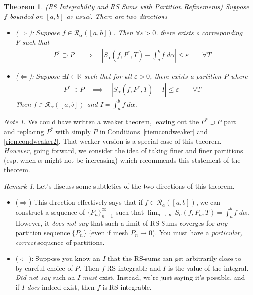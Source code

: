 \documentclass[12pt]{book}
\numberwithin{equation}{section} %
\theoremstyle{plain}
\newtheorem{thm}{Theorem}[section]
\theoremstyle{definition}
\theoremstyle{remark}
\newtheorem*{rmk}{Remark}
\newtheorem*{note}{Note}
\newcommand{\limn}{\lim_{n\rightarrow\infty}}
\newcommand{\ra}{\rightarrow}
\newcommand{\sR}{\mathscr{R}}
\newcommand{\R}{\mathbb{R}}
\begin{document}
\begin{thm}
\emph{(RS Integrability and RS Sums with Partition Refinements)}
\label{weaker}
Suppose $f$ bounded on $[a,b]$ as usual.
There are two directions
\begin{itemize}
  \item \emph{($\Rightarrow$)}:
    Suppose $f\in\sR_\alpha([a,b])$.
    Then $\forall\varepsilon>0$, there exists a corresponding $P$ such
    that
    \begin{align}
      P^*\supset P\quad\implies\quad
      \left\lvert S_\alpha(f,P^*,T) - \int^b_af\;d\alpha \right\rvert
      \leq \varepsilon \qquad \forall T
      \label{riemcondweaker}
    \end{align}
  \item \emph{($\Leftarrow$)}:
    Suppose $\exists I\in\R$ such that for all $\varepsilon>0$, there
    exists a partition $P$ where
    \begin{align}
      P^*\supset P\quad\implies\quad
      \left\lvert S_\alpha(f,P^*,T) - I \right\rvert
      \leq \varepsilon \qquad \forall T
      \label{riemcondweaker2}
    \end{align}
    Then $f\in\mathscr{R}_\alpha([a,b])$ and
     $I = \int^b_a f\;d\alpha$.
\end{itemize}
\end{thm}
\begin{note}
We could have written a weaker theorem, leaving out the $P^*\supset P$
part and replacing $P^*$ with simply $P$ in
Conditions~\ref{riemcondweaker} and \ref{riemcondweaker2}.
That weaker version is a special case of this theorem.
\emph{However}, going forward, we consider the idea of taking
finer and finer partitions (esp. when $\alpha$ might not be increasing)
which recommends this statement of the theorem.
\end{note}
\begin{rmk}
Let's discuss some subtleties of the two directions of this theorem.
\begin{itemize}
  \item ($\Rightarrow$)
    This direction effectively says that if $f\in\sR_\alpha([a,b])$,
    we can construct a sequence of $\{P_n\}_{n=1}^\infty$ such that
    $\limn S_\alpha(f,P_n,T)=\int^b_af\;d\alpha$.
    However, it \emph{does not say} that such a limit of RS Sums
    coverges for \emph{any} partition sequence $\{P_n\}$ (even if mesh
    $P_n\ra 0$).
    You must have a \emph{particular, correct} sequence of partitions.

  \item
    ($\Leftarrow$):
    Suppose you know an $I$ that the RS-sums can get arbitrarily
    close to by careful choice of $P$.
    Then $f$ RS-integrable and $I$ is the value of the integral.
    \emph{Did not say} such an $I$ \emph{must} exist.
    Instead, we're just saying it's possible, and if $I$ \emph{does}
    indeed exist, then $f$ is RS integrable.
\end{itemize}
\end{rmk}
\end{document}

